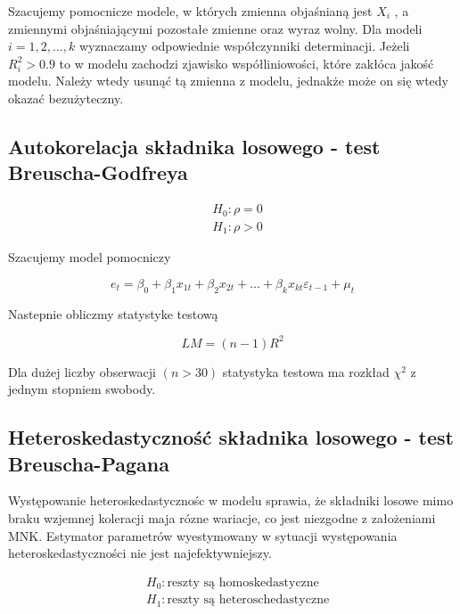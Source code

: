Szacujemy pomocnicze modele, w których zmienna objaśnianą jest \(X_i\) , a zmiennymi objaśniającymi pozostałe zmienne oraz wyraz wolny.
Dla modeli \(i=1,2, \dots ,k \) wyznaczamy odpowiednie współczynniki determinacji.
Jeżeli \(R_{i}^{2} > 0.9\) to w modelu zachodzi zjawisko współliniowości, które zakłóca jakość modelu.
Należy wtedy usunąć tą zmienna z modelu, jednakże może on się wtedy okazać bezużyteczny.

\subsection{Autokorelacja składnika losowego - test Breuscha-Godfreya}\label{subsec:autokorelacja-składnika-losowego}

\begin{equation}
    \begin{split}
        &H_0: \rho = 0 \\
        &H_1: \rho > 0
    \end{split}
\end{equation}

Szacujemy model pomocniczy

\begin{equation}
    e_{t} = \beta_{0} + \beta_{1}x_{1t} + \beta_{2}x_{2t} + \dots + \beta_{k}x_{kt}\varepsilon_{t-1} + \mu_{t}
\end{equation}

Nastepnie obliczmy statystyke testową

\begin{equation}
    LM = (n-1)R^2
\end{equation}

Dla dużej liczby obserwacji \((n > 30)\) statystyka testowa ma rozkład \(\chi^2\) z jednym stopniem swobody.

\subsection{Heteroskedastyczność składnika losowego - test Breuscha-Pagana}\label{subsec:heteroskedastyczność-składnika-losowego}

Występowanie heteroskedastycznośc w modelu sprawia, że składniki losowe mimo braku wzjemnej koleracji maja rózne wariacje, co jest niezgodne z założeniami MNK.
Estymator parametrów wyestymowany w sytuacji występowania heteroskedastyczności nie jest najefektywniejszy.

\begin{equation}
    \begin{split}
        &H_0: \text{reszty są homoskedastyczne}\\
        &H_1: \text{reszty są heteroschedastyczne}
    \end{split}
\end{equation}

